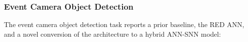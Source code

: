 

    


    
    \subsubsection*{Event Camera Object Detection}

    

    The event camera object detection task reports a prior baseline, the RED ANN, and a novel conversion of the architecture to a hybrid ANN-SNN model:
    
